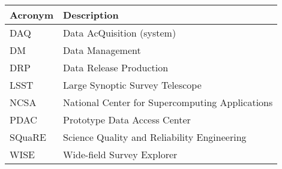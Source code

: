 \addtocounter{table}{-1}
\begin{longtable}{|l|p{}|}\hline 
\textbf{Acronym} & \textbf{Description}  \\\hline
DAQ&Data AcQuisition (system) \\\hline
DM&Data Management \\\hline
DRP&Data Release Production \\\hline
LSST&Large Synoptic Survey Telescope \\\hline
NCSA&National Center for Supercomputing Applications \\\hline
PDAC&Prototype Data Access Center \\\hline
SQuaRE&Science Quality and Reliability Engineering \\\hline
WISE&Wide-field Survey Explorer \\\hline
\end{longtable} 
